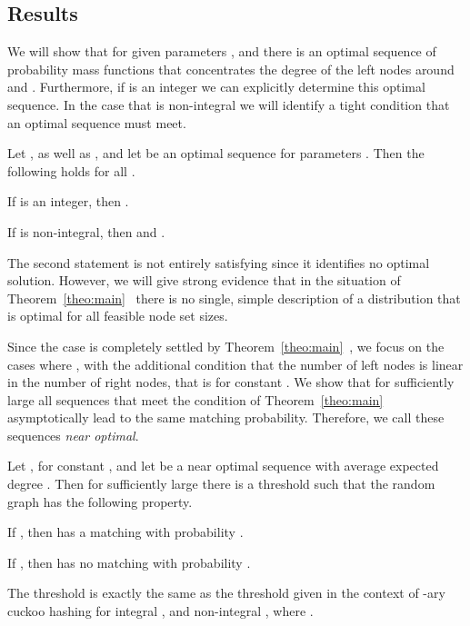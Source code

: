\let\accentvec\vec \documentclass{llncs}
\begin{document}
\subsection{Results}
We will show that for given parameters , and  there is an optimal sequence
of probability mass functions that concentrates the degree of the left nodes
around  and .
Furthermore, if  is an integer we can explicitly determine this optimal sequence. In the
case that  is non-integral we will identify a tight condition that an optimal sequence must meet. 
\begin{theorem}
\label{theo:main}
Let , as well as , and
let  be an optimal sequence for parameters .
Then the following holds for all .
\begin{compactenum}[(i)]
\item If  is an integer, then .
\item If  is non-integral, then  and .\end{compactenum}
\end{theorem}
The second statement is not entirely satisfying since it identifies no optimal solution.
However, we will give strong evidence that in the situation of Theorem~\ref{theo:main}~ there is no single,
simple description of a distribution that is optimal for all feasible node set sizes.

Since the case  is completely settled by Theorem~\ref{theo:main}~,
we focus on the cases where , with the additional condition that the number of left nodes is linear in the number of right nodes, that is  for constant .
We show that for sufficiently large  all sequences that meet the condition of Theorem~\ref{theo:main}~ 
asymptotically lead to the same matching probability. Therefore, we call these sequences \emph{near optimal}.
\begin{proposition}
\label{prop:thresholds}
Let , for constant , and let  be a near optimal sequence with average expected degree .
Then for sufficiently large  there is a threshold  such that the random graph  
has the following property. 
\begin{compactenum}[(i)]
\item  If  , then   has a matching with probability .
\item  If  , then    has no matching with probability .
\end{compactenum}
\end{proposition}
The threshold  is exactly the same as the threshold given in the context of -ary cuckoo hashing for
integral  \cite{FM_maximum_2009,FP_orientability_2010,DGMMPR_tight_2010}, and non-integral  \cite{DGMMPR_tight_2010}, where .
\end{document}
